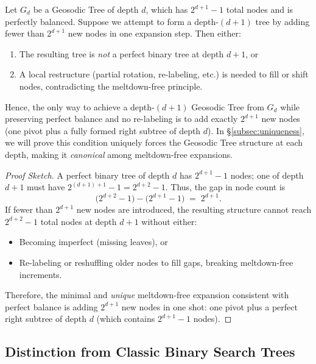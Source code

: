 \begin{lemma}
\label{lem:no-smaller-step}
Let $G_d$ be a Geosodic Tree of depth $d$, which has $2^{d+1}-1$ total nodes 
and is perfectly balanced. Suppose we attempt to form a depth-$(d+1)$ tree by adding 
fewer than $2^{d+1}$ new nodes in one expansion step. Then either:
\begin{enumerate}
  \item The resulting tree is \emph{not} a perfect binary tree at depth $d+1$, or
  \item A local restructure (partial rotation, re-labeling, etc.) is needed to fill 
        or shift nodes, contradicting the meltdown-free principle.
\end{enumerate}
Hence, the only way to achieve a depth-$(d+1)$ Geosodic Tree from $G_d$ while preserving 
perfect balance and no re-labeling is to add exactly $2^{d+1}$ new nodes (one pivot plus a 
fully formed right subtree of depth $d$). In \S\ref{subsec:uniqueness},
we will prove this condition uniquely forces the Geosodic Tree structure
at each depth, making it \emph{canonical} among meltdown-free expansions.

\begin{proof}[Proof Sketch]
A perfect binary tree of depth $d$ has $2^{d+1}-1$ nodes; 
one of depth $d+1$ must have $2^{(d+1)+1}-1 = 2^{d+2}-1$. 
Thus, the gap in node count is 
\[
  \bigl(2^{d+2}-1\bigr) - \bigl(2^{d+1}-1\bigr) 
  \;=\;
  2^{d+1}.
\]
If fewer than $2^{d+1}$ new nodes are introduced, the resulting structure 
cannot reach $2^{d+2}-1$ total nodes at depth $d+1$ without either:
\begin{itemize}
  \item Becoming imperfect (missing leaves), or
  \item Re-labeling or reshuffling older nodes to fill gaps, breaking meltdown-free increments.
\end{itemize}
Therefore, the minimal and \emph{unique} meltdown-free expansion consistent with 
perfect balance is adding $2^{d+1}$ new nodes in one shot: 
one pivot plus a perfect right subtree of depth $d$ (which contains $2^{d+1}-1$ nodes).
\end{proof}
\end{lemma}

\subsection{Distinction from Classic Binary Search Trees}
\label{sec:distinction}


